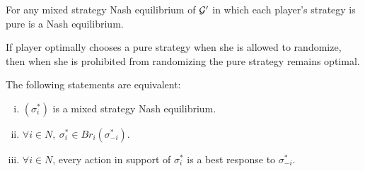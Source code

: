 \documentclass[11pt]{article}
\begin{document}
		\begin{proposition}
			For any mixed strategy Nash equilibrium of $\mathcal{{G}}'$ in which each player's strategy is pure is a Nash equilibrium.
		\end{proposition}
		
		\begin{remark}
			If player optimally chooses a pure strategy when she is allowed to randomize, then when she is prohibited from randomizing the pure strategy remains optimal.
		\end{remark}
		
		\begin{proposition}
			The following statements are equivalent:
			\begin{enumerate}[(i)]
				\item $(\sigma^*_i)$ is a mixed strategy Nash equilibrium.
				\item $\forall i \in N,\ \sigma^*_i \in Br_i(\sigma_{-i}^*)$.
				\item $\forall i \in N$, every action in support of $\sigma^*_i$ is a best response to $\sigma_{-i}^*$.
			\end{enumerate} 
		\end{proposition}
\end{document}
